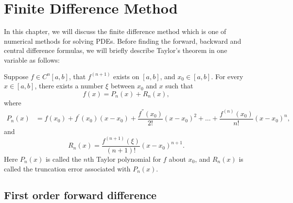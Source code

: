 \chapter{Finite Difference Method}
In this chapter, we will discuss the finite difference method which is one of numerical methods for solving PDEs. Before finding the forward, backward and central difference formulas, we will briefly describe Taylor's theorem in one variable as follows:
\begin{Theorem}{}
	Suppose $f \in C^{n}[a, b]$, that $f^{(n+1)}$ exists on $[a, b]$, and $x_{0} \in [a, b]$. For every $x \in [a, b]$, there exists a number $\xi$ between $x_{0}$ and $x$ such that
	$$f(x) = P_{n}(x) + R_{n}(x),$$
	where 
	\begin{align*}
	P_{n}(x) & = f(x_{0}) + f^{'}(x_{0})(x - x_{0}) +   \dfrac{f^{''}(x_{0})}{2!}(x - x_{0})^{2}+\dots+ \dfrac{f^{(n)}(x_{0})}{n!}(x - x_{0})^{n},
    \end{align*}
	and
	$$ R_{n}(x) =  \dfrac{f^{(n+1)}(\xi)}{(n+1)!}(x - x_{0})^{n+1}.$$
	Here $P_{n}(x)$ is called the $n\text{th}$ Taylor polynomial for $f$ about $x_{0}$, and $R_{n}(x)$ is called the truncation error associated with $P_{n}(x)$.
\end{Theorem}

\section{First order forward difference}
